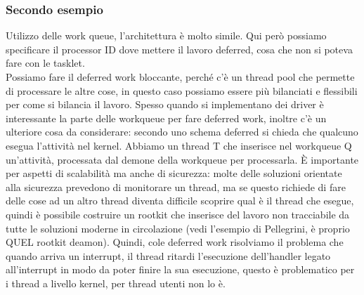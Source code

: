 \documentclass[12pt, oneside]{extbook}
\begin{document}
\subsubsection{Secondo esempio}
Utilizzo delle work queue, l'architettura è molto simile. Qui però possiamo specificare il processor ID dove mettere il lavoro deferred, cosa che non si poteva fare con le tasklet.\\Possiamo fare il deferred work bloccante, perché c'è un thread pool che permette di processare le altre cose, in questo caso possiamo essere più bilanciati e flessibili per come si bilancia il lavoro. Spesso quando si implementano dei driver è interessante la parte delle workqueue per fare deferred work, inoltre c'è un ulteriore cosa da considerare: secondo uno schema deferred si chieda che qualcuno esegua l'attività nel kernel. Abbiamo un thread T che inserisce nel workqueue Q un'attività, processata dal demone della workqueue per processarla. È importante per aspetti di scalabilità ma anche di sicurezza: molte delle soluzioni orientate alla sicurezza prevedono di monitorare un thread, ma se questo richiede di fare delle cose ad un altro thread diventa difficile scoprire qual è il thread che esegue, quindi è possibile costruire un rootkit che inserisce del lavoro non tracciabile da tutte le soluzioni moderne in circolazione (vedi l'esempio di Pellegrini, è proprio QUEL rootkit deamon).
Quindi, cole deferred work risolviamo il problema che quando arriva un interrupt, il thread ritardi l'esecuzione dell'handler legato all'interrupt in modo da poter finire la sua esecuzione, questo è problematico per i thread a livello kernel, per thread utenti non lo è.
\end{document}
